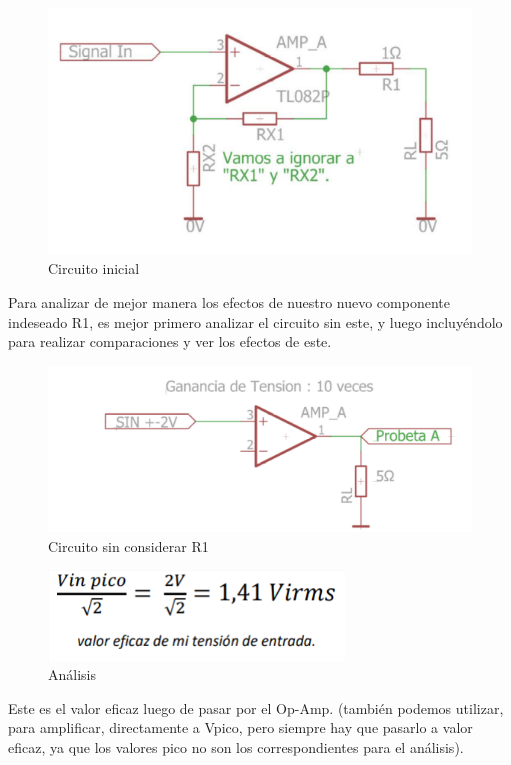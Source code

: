 \documentclass[../main.tex]{subfiles}
\begin{document}
	\begin{figure}[H]
		\includegraphics[width=\textwidth]{imagen1.png}
		\centering
		\caption{Circuito inicial}
	\end{figure}

	Para analizar de mejor manera los efectos de nuestro nuevo componente indeseado 
	R1, es mejor primero analizar el circuito sin este, y luego incluyéndolo para 
	realizar comparaciones y ver los efectos de este.

	\begin{figure}[H]
		\includegraphics[width=\textwidth]{imagen2.png}
		\centering
		\caption{Circuito sin considerar R1}
	\end{figure}
	
	\begin{figure}[H]
		\includegraphics[width=0.7\textwidth]{imagen3.png}
		\centering
		\caption{Análisis}
	\end{figure}

	Este es el valor eficaz luego de pasar por el Op-Amp. (también podemos 
	utilizar, para amplificar, directamente a Vpico, pero siempre hay que 
	pasarlo a valor eficaz, ya que los valores pico no son los correspondientes 
	para el análisis).
\end{document}
